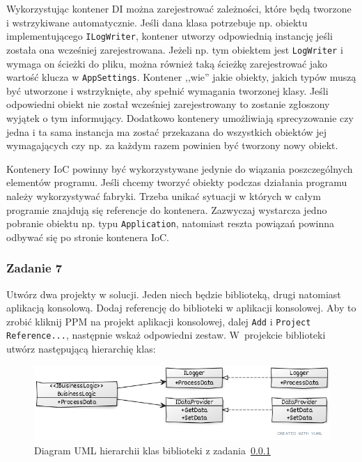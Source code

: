Wykorzystując kontener DI można zarejestrować zależności, które będą tworzone i wstrzykiwane automatycznie. Jeśli dana klasa potrzebuje np. obiektu implementującego \texttt{ILogWriter}, kontener utworzy odpowiednią instancję jeśli została ona wcześniej zarejestrowana. Jeżeli np. tym obiektem jest \texttt{LogWriter} i wymaga on ścieżki do pliku, można również taką ścieżkę zarejestrować jako wartość klucza w \texttt{AppSettings}. Kontener ,,wie'' jakie obiekty, jakich typów muszą być utworzone i wstrzyknięte, aby spełnić wymagania tworzonej klasy. Jeśli odpowiedni obiekt nie został wcześniej zarejestrowany to zostanie zgłoszony wyjątek o tym informujący. Dodatkowo kontenery umożliwiają sprecyzowanie czy jedna i ta sama instancja ma zostać przekazana do wszystkich obiektów jej wymagających czy np. za każdym razem powinien być tworzony nowy obiekt.

Kontenery IoC powinny być wykorzystywane jedynie do wiązania poszczególnych elementów programu. Jeśli chcemy tworzyć obiekty podczas działania programu należy wykorzystywać fabryki. Trzeba unikać sytuacji w których w całym programie znajdują się referencje do kontenera. Zazwyczaj wystarcza jedno pobranie obiektu np. typu \texttt{Application}, natomiast reszta powiązań powinna odbywać się po stronie kontenera IoC.

\subsubsection{Zadanie 7}\label{lab1/ex/IoC}
Utwórz dwa projekty w solucji. Jeden niech będzie biblioteką, drugi natomiast aplikacją konsolową. Dodaj referencję do biblioteki w aplikacji konsolowej. Aby to zrobić kliknij PPM na projekt aplikacji konsolowej, dalej \texttt{Add} i \texttt{Project Reference...}, następnie wskaż odpowiedni zestaw. W~projekcie biblioteki utwórz następującą hierarchię klas:
\begin{figure}[hbt!]
	\centering
	\includegraphics[width=0.8\linewidth]{images/ExerciseIocLib}
	\caption{Diagram UML hierarchii klas biblioteki z zadania~\ref{lab1/ex/IoC}}
	\label{lab1/fig/IoC}
\end{figure}

%

